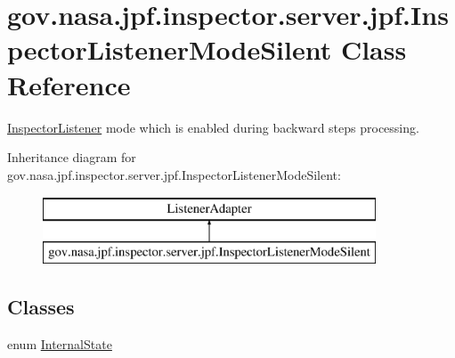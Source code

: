\hypertarget{classgov_1_1nasa_1_1jpf_1_1inspector_1_1server_1_1jpf_1_1_inspector_listener_mode_silent}{}\section{gov.\+nasa.\+jpf.\+inspector.\+server.\+jpf.\+Inspector\+Listener\+Mode\+Silent Class Reference}
\label{classgov_1_1nasa_1_1jpf_1_1inspector_1_1server_1_1jpf_1_1_inspector_listener_mode_silent}


\hyperlink{classgov_1_1nasa_1_1jpf_1_1inspector_1_1server_1_1jpf_1_1_inspector_listener}{Inspector\+Listener} mode which is enabled during backward steps processing.  


Inheritance diagram for gov.\+nasa.\+jpf.\+inspector.\+server.\+jpf.\+Inspector\+Listener\+Mode\+Silent\+:\begin{figure}[H]
\begin{center}
\leavevmode
\includegraphics[height=2.000000cm]{classgov_1_1nasa_1_1jpf_1_1inspector_1_1server_1_1jpf_1_1_inspector_listener_mode_silent}
\end{center}
\end{figure}
\subsection*{Classes}
\begin{DoxyCompactItemize}
\item 
enum \hyperlink{enumgov_1_1nasa_1_1jpf_1_1inspector_1_1server_1_1jpf_1_1_inspector_listener_mode_silent_1_1_internal_state}{Internal\+State}
\end{DoxyCompactItemize}
